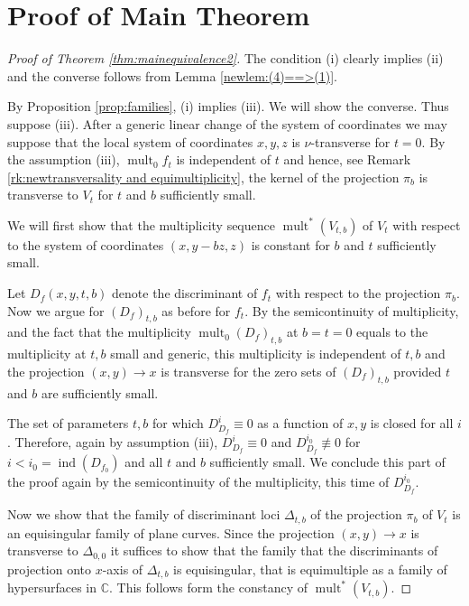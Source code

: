 \documentclass[11pt,a4paper]{amsart}
\newcommand{\1}{{1\!\!1}}
\numberwithin{equation}{section}
\theoremstyle{plain}%
\theoremstyle{definition}
\theoremstyle{definition}
\theoremstyle{remark}
\newcommand{\C}{\mathbb{C}}
\renewcommand{\1}{\mathbf{1}}
\DeclareMathOperator{\snu}{mult}
\DeclareMathOperator{\idiscr}{ind}
\DeclareMathOperator{\mult}{mult}
\newcommand{\unt}{$\nu$-transverse }
\newcommand{\multseq}{multiplicity sequence }
\begin{document}
\section{Proof of Main Theorem}
\label{sec:proofofmaintheorem}



\begin{proof}[Proof of Theorem \ref{thm:mainequivalence2}]
The condition (i) clearly implies (ii) and the converse follows from Lemma \ref{newlem:(4)==>(1)}.  

By Proposition \ref{prop:families}, (i) implies (iii).  We will show the converse. Thus suppose (iii).  After a generic linear change of the system of coordinates we may suppose that the local system of coordinates $x,y,z$ is \unt for $t=0$.  By the assumption (iii),  $\mult_0 {f_t}$ is independent of $t$ and hence, see Remark \ref{rk:newtransversality and equimultiplicity},  the kernel of the projection $\pi_b$ is transverse to $V_t$ for $t$ and $b$ sufficiently small. 

We will first show that the \multseq $\snu^* (V_{t,b})$ of $V_t$ with respect to the system of coordinates $(x, y-bz, z)$ is constant for $b$ and $t$ sufficiently small.  

Let $D_f (x,y,t,b)$ denote the discriminant of $f_t$ with respect to the projection $\pi_b$.   Now we argue for $(D_f)_{t,b}$ as before for $f_t$.  By the semicontinuity of multiplicity, and the fact that the multiplicity $\mult_0 (D_f)_{t,b}$ at $b=t=0$ equals to the multiplicity at $t,b$ small and generic, this multiplicity is independent of $t,b$  and the projection $(x,y)\to x$ is transverse for the zero sets of $(D_f)_{t,b}$ provided $t$ and $b$ are sufficiently small.  

The set of parameters $t,b$ for which $D^i_{D_f} \equiv 0$ as a function of  $x,y$ is closed for all $i$. Therefore, again by assumption (iii),  $D^i_{D_f} \equiv 0$ and $D^{i_0}_{D_f}\not \equiv 0$ for  $i<i_0=\idiscr ({D_{f_0}}) $ and all $t$ and $b$ sufficiently small.    We conclude this part of the proof again by the semicontinuity of the multiplicity, this time  of $D^{i_0}_{D_f}$.    

Now we show that the family of discriminant loci $\Delta_{t,b}$ of the projection $\pi_b$ of $V_t$ is an equisingular family of plane curves. Since the projection $(x,y) \to x$ is transverse to $\Delta_{0,0}$ it suffices to show that the family that the discriminants of projection onto $x$-axis of $\Delta_{t,b}$ is equisingular, that is equimultiple as a family of hypersurfaces in 
$\C$.  This follows form the constancy of $\snu^* (V_{t,b})$.    
\end{proof}
\end{document}
